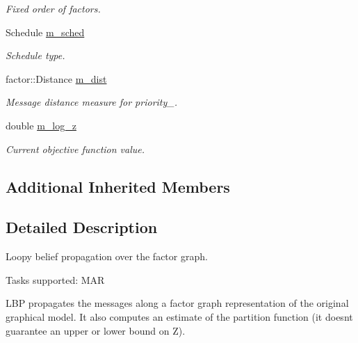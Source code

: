 \begin{DoxyCompactItemize}
\begin{DoxyCompactList}\small\item\em Fixed order of factors. \end{DoxyCompactList}\item 
\hypertarget{classmerlin_1_1lbp_a612e3dee4fede5efb97edf155c7d6d6f}{}Schedule \hyperlink{classmerlin_1_1lbp_a612e3dee4fede5efb97edf155c7d6d6f}{m\+\_\+sched}\label{classmerlin_1_1lbp_a612e3dee4fede5efb97edf155c7d6d6f}

\begin{DoxyCompactList}\small\item\em Schedule type. \end{DoxyCompactList}\item 
\hypertarget{classmerlin_1_1lbp_ad38eb15e14383af32cc33beed58d0a33}{}factor\+::\+Distance \hyperlink{classmerlin_1_1lbp_ad38eb15e14383af32cc33beed58d0a33}{m\+\_\+dist}\label{classmerlin_1_1lbp_ad38eb15e14383af32cc33beed58d0a33}

\begin{DoxyCompactList}\small\item\em Message distance measure for priority\+\_\+. \end{DoxyCompactList}\item 
\hypertarget{classmerlin_1_1lbp_aae920e31f7765ddedd24326ad28dde15}{}double \hyperlink{classmerlin_1_1lbp_aae920e31f7765ddedd24326ad28dde15}{m\+\_\+log\+\_\+z}\label{classmerlin_1_1lbp_aae920e31f7765ddedd24326ad28dde15}

\begin{DoxyCompactList}\small\item\em Current objective function value. \end{DoxyCompactList}\end{DoxyCompactItemize}
\subsection*{Additional Inherited Members}


\subsection{Detailed Description}
Loopy belief propagation over the factor graph.

Tasks supported\+: M\+A\+R

L\+B\+P propagates the messages along a factor graph representation of the original graphical model. It also computes an estimate of the partition function (it doesn\textquotesingle{}t guarantee an upper or lower bound on Z). 

